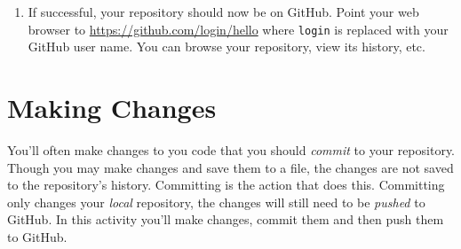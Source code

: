 \documentclass[12pt]{scrartcl}
\begin{document}
\begin{enumerate}
  \item If successful, your repository should now be on GitHub.
  Point your web browser to \url{https://github.com/login/hello}
  where \texttt{login} is replaced with your GitHub user
  name.  You can browse your repository, view its history, etc.
  
\end{enumerate}

\section{Making Changes}

You'll often make changes to you code that you should \emph{commit} to
your repository.  Though you may make changes and save them to a file, 
the changes are not saved to the repository's history.  Committing is 
the action that does this.  Committing only changes your \emph{local}
repository, the changes will still need to be \emph{pushed} to GitHub.
In this activity you'll make changes, commit them and then push them
to GitHub.
\end{document}
